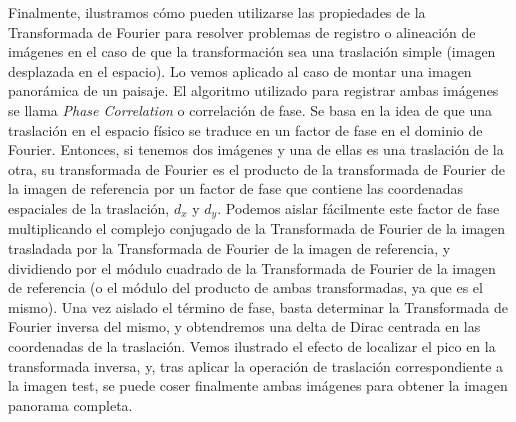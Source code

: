 \documentclass[12pt,a4paper]{report}
\begin{document}
	
	Finalmente, ilustramos cómo pueden utilizarse las propiedades de la Transformada de Fourier para resolver problemas de registro o alineación de imágenes en el caso de que la transformación sea una traslación simple (imagen desplazada en el espacio). Lo vemos aplicado al caso de montar una imagen panorámica de un paisaje. El algoritmo utilizado para registrar ambas imágenes se llama \textit{Phase Correlation} o correlación de fase. Se basa en la idea de que una traslación en el espacio físico se traduce en un factor de fase en el dominio de Fourier. Entonces, si tenemos dos imágenes y una de ellas es una traslación de la otra, su transformada de Fourier es el producto de la transformada de Fourier de la imagen de referencia por un factor de fase que contiene las coordenadas espaciales de la traslación, $d_x$ y $d_y$. Podemos aislar fácilmente este factor de fase multiplicando el complejo conjugado de la Transformada de Fourier de la imagen trasladada por la Transformada de Fourier de la imagen de referencia, y dividiendo por el módulo cuadrado de la Transformada de Fourier de la imagen de referencia (o el módulo del producto de ambas transformadas, ya que es el mismo). Una vez aislado el término de fase, basta determinar la Transformada de Fourier inversa del mismo, y obtendremos una delta de Dirac centrada en las coordenadas de la traslación. Vemos ilustrado el efecto de localizar el pico en la transformada inversa, y, tras aplicar la operación de traslación correspondiente a la imagen test, se puede coser finalmente ambas imágenes para obtener la imagen panorama completa.
	
	
	
	
	\printbibliography[title={Bibliografía}]
\end{document}
